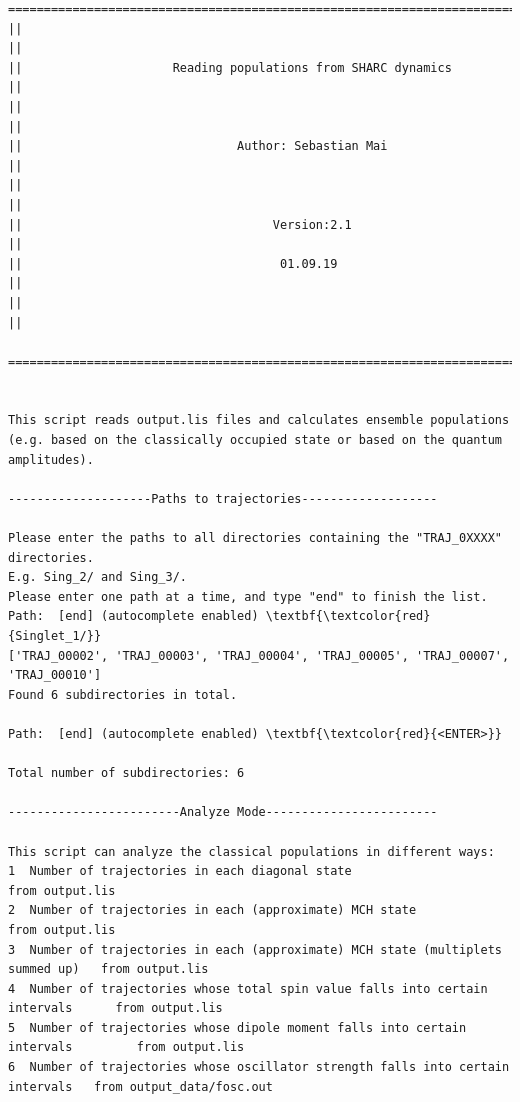 \documentclass[a4paper,11pt,DIV=15,openany]{scrbook}
\begin{document}
\begin{oframed}
\footnotesize\begin{Verbatim}[commandchars=\\\{\}]
  ================================================================================
||                                                                                ||
||                     Reading populations from SHARC dynamics                    ||
||                                                                                ||
||                              Author: Sebastian Mai                             ||
||                                                                                ||
||                                   Version:2.1                                  ||
||                                    01.09.19                                    ||
||                                                                                ||
  ================================================================================


This script reads output.lis files and calculates ensemble populations 
(e.g. based on the classically occupied state or based on the quantum amplitudes).
  
--------------------Paths to trajectories-------------------

Please enter the paths to all directories containing the "TRAJ_0XXXX" directories.
E.g. Sing_2/ and Sing_3/. 
Please enter one path at a time, and type "end" to finish the list.
Path:  [end] (autocomplete enabled) \textbf{\textcolor{red}{Singlet_1/}}
['TRAJ_00002', 'TRAJ_00003', 'TRAJ_00004', 'TRAJ_00005', 'TRAJ_00007', 'TRAJ_00010']
Found 6 subdirectories in total.

Path:  [end] (autocomplete enabled) \textbf{\textcolor{red}{<ENTER>}}

Total number of subdirectories: 6

------------------------Analyze Mode------------------------

This script can analyze the classical populations in different ways:
1  Number of trajectories in each diagonal state                                   from output.lis
2  Number of trajectories in each (approximate) MCH state                          from output.lis
3  Number of trajectories in each (approximate) MCH state (multiplets summed up)   from output.lis
4  Number of trajectories whose total spin value falls into certain intervals      from output.lis
5  Number of trajectories whose dipole moment falls into certain intervals         from output.lis
6  Number of trajectories whose oscillator strength falls into certain intervals   from output_data/fosc.out


\end{Verbatim}
\end{oframed}
\end{document}
